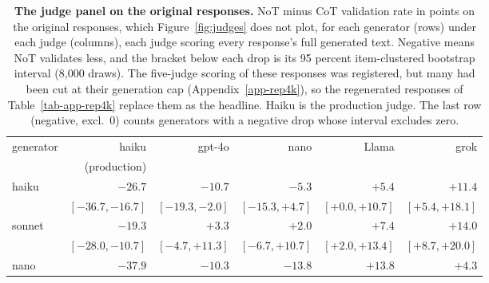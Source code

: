 \begin{table}[t]
\centering
\caption{\textbf{The judge panel on the original responses.}
NoT minus CoT validation rate in points on the original responses,
which Figure~\ref{fig:judges} does not plot, for each generator (rows) under
each judge (columns), each judge scoring every response's full generated text. Negative
means NoT validates less, and the bracket below each drop is its 95 percent
item-clustered bootstrap interval (8,000 draws). The five-judge scoring of these responses
was registered, but many had been cut at their generation cap
(Appendix~\ref{app-rep4k}), so the regenerated responses of
Table~\ref{tab-app-rep4k} replace them as the headline. Haiku is the
production judge. The last row (negative, excl.\ 0) counts generators with a
negative drop whose interval excludes zero.}
\label{tab-app-judge-drops}
{\footnotesize
\setlength{\tabcolsep}{4pt}%
\begin{tabular}{@{}lrrrrr@{}}
\toprule
generator & haiku & gpt-4o & nano & Llama & grok \\
 & (production) & & & & \\
\midrule
haiku & $-26.7$ & $-10.7$ & $-5.3$ & $+5.4$ & $+11.4$ \\
 & $[-36.7, -16.7]$ & $[-19.3, -2.0]$ & $[-15.3, +4.7]$ & $[+0.0, +10.7]$ & $[+5.4, +18.1]$ \\[1pt]
sonnet & $-19.3$ & $+3.3$ & $+2.0$ & $+7.4$ & $+14.0$ \\
 & $[-28.0, -10.7]$ & $[-4.7, +11.3]$ & $[-6.7, +10.7]$ & $[+2.0, +13.4]$ & $[+8.7, +20.0]$ \\[1pt]
nano & $-37.9$ & $-10.3$ & $-13.8$ & $+13.8$ & $+4.3$ \\

\end{tabular}}
\end{table}
